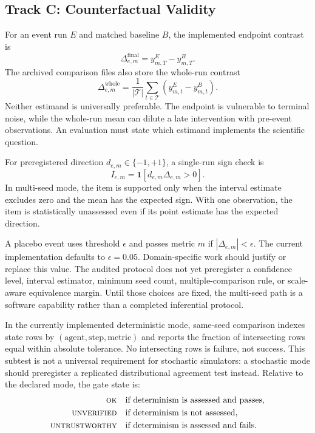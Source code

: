 \documentclass[letterpaper]{article}
\begin{document}
\subsection{Track C: Counterfactual Validity}

For an event run $E$ and matched baseline $B$, the implemented endpoint contrast is
\begin{equation}
\Delta^{\mathrm{final}}_{e,m}=y^{E}_{m,T}-y^{B}_{m,T}.
\end{equation}
The archived comparison files also store the whole-run contrast
\begin{equation}
\Delta^{\mathrm{whole}}_{e,m}=\frac{1}{|\mathcal{T}|}
\sum_{t\in\mathcal{T}}\left(y^{E}_{m,t}-y^{B}_{m,t}\right).
\end{equation}
Neither estimand is universally preferable. The endpoint is vulnerable to terminal noise, while the
whole-run mean can dilute a late intervention with pre-event observations. An evaluation must state which
estimand implements the scientific question.

For preregistered direction $d_{e,m}\in\{-1,+1\}$, a single-run sign check is
\begin{equation}
I_{e,m}=\mathbf{1}\left[d_{e,m}\Delta_{e,m}>0\right].
\end{equation}
In multi-seed mode, the item is supported only when the interval estimate excludes zero and the mean has
the expected sign. With one observation, the item is statistically unassessed even if its point estimate
has the expected direction.

A placebo event uses threshold $\epsilon$ and passes metric $m$ if $|\Delta_{e,m}|<\epsilon$. The current
implementation defaults to $\epsilon=0.05$. Domain-specific work should justify or replace this value.
The audited protocol does not yet preregister a confidence level, interval estimator, minimum seed count,
multiple-comparison rule, or scale-aware equivalence margin. Until those choices are fixed, the
multi-seed path is a software capability rather than a completed inferential protocol.

In the currently implemented deterministic mode, same-seed comparison indexes state rows by
$(\text{agent},\text{step},\text{metric})$ and reports the fraction of intersecting rows equal within
absolute tolerance. No intersecting rows is failure, not success. This subtest is not a universal
requirement for stochastic simulators: a stochastic mode should preregister a replicated distributional
agreement test instead. Relative to the declared mode, the gate state is:
\begin{align}
\textsc{ok} &\quad\text{if determinism is assessed and passes},\\
\textsc{unverified} &\quad\text{if determinism is not assessed},\\
\textsc{untrustworthy} &\quad\text{if determinism is assessed and fails}.
\end{align}
\end{document}
